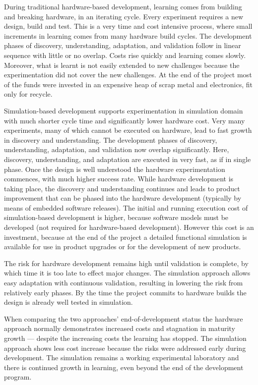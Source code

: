 During traditional hardware-based development, learning comes from building and  breaking hardware, in an iterating cycle. Every experiment requires a new design, build and test. This is a very time and cost intensive process, where small increments in learning comes from many hardware build cycles. 
The development phases of discovery, understanding, adaptation, and validation follow in linear sequence with little or no overlap.
Costs rise quickly and learning comes slowly. Moreover, what is learnt is not easily extended to new challenges because the experimentation did not cover the new challenges.  At the end of the project most of the funds were invested in an expensive heap of scrap metal and electronics, fit only for recycle.

Simulation-based development supports experimentation in simulation domain with much shorter cycle time and significantly lower hardware cost.  Very many experiments, many of which cannot be executed on hardware, lead to fast growth in discovery and understanding.  The development phases of discovery, understanding, adaptation, and validation now overlap significantly. Here, discovery, understanding, and adaptation are executed in very fast, as if in  single phase. Once the design is well understood the hardware experimentation commences, with much higher success rate.
While hardware development is taking place, the discovery and understanding continues and leads to product improvement that can be phased into the hardware development (typically by means of embedded software releases). 
The initial and running execution cost of simulation-based development is higher, because software models must be developed (not required for hardware-based development). However this cost is an investment, because at the end of the project a detailed functional simulation is available for use in product upgrades or for the development of new products.

The risk for hardware development remains high until validation is complete, by which time it is too late to effect major changes.  The simulation approach allows easy adaptation with continuous validation, resulting in lowering the risk from relatively early phases.  By the time the project commits to hardware builds the design is already well tested in simulation.

When comparing the two approaches' end-of-development status the hardware approach normally demonstrates increased costs and stagnation in maturity growth --- despite the increasing costs the learning has stopped. The simulation approach shows less cost increase because the risks were addressed early during development. The simulation remains a working experimental laboratory and there is continued growth in learning, even beyond the end of the development program.



